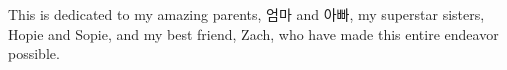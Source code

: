 
This is dedicated to my amazing parents, 엄마 and 아빠, my superstar sisters, Hopie and Sopie, and my best friend, Zach, who have made this entire endeavor possible.
